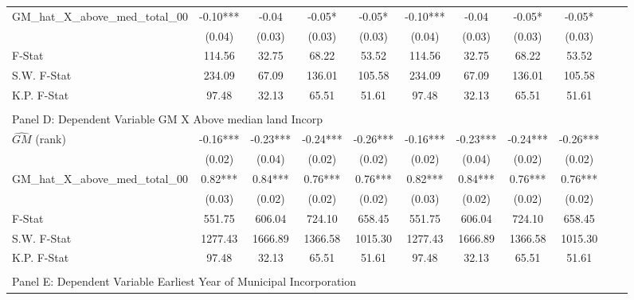 \begin{table}[htbp]
\begin{threeparttable}
\begin{tabular}{l*{10}{c}}
\addlinespace
GM\_hat\_X\_above\_med\_total\_00&      -0.10***&      -0.04   &      -0.05*  &      -0.05*  &      -0.10***&      -0.04   &      -0.05*  &      -0.05*  \\
                &     (0.04)   &     (0.03)   &     (0.03)   &     (0.03)   &     (0.04)   &     (0.03)   &     (0.03)   &     (0.03)   \\
\midrule
F-Stat          &     114.56   &      32.75   &      68.22   &      53.52   &     114.56   &      32.75   &      68.22   &      53.52   \\
S.W. F-Stat     &     234.09   &      67.09   &     136.01   &     105.58   &     234.09   &      67.09   &     136.01   &     105.58   \\
K.P. F-Stat     &      97.48   &      32.13   &      65.51   &      51.61   &      97.48   &      32.13   &      65.51   &      51.61   \\
\cmidrule[\heavyrulewidth](lr){1-9} \\ \cmidrule[\heavyrulewidth](lr){1-9}
\multicolumn{8}{l}{Panel D: Dependent Variable GM X Above median land Incorp}\\
\cmidrule(lr){1-9}
$\hat{GM}$ (rank)&      -0.16***&      -0.23***&      -0.24***&      -0.26***&      -0.16***&      -0.23***&      -0.24***&      -0.26***\\
                &     (0.02)   &     (0.04)   &     (0.02)   &     (0.02)   &     (0.02)   &     (0.04)   &     (0.02)   &     (0.02)   \\
\addlinespace
GM\_hat\_X\_above\_med\_total\_00&       0.82***&       0.84***&       0.76***&       0.76***&       0.82***&       0.84***&       0.76***&       0.76***\\
                &     (0.03)   &     (0.02)   &     (0.02)   &     (0.02)   &     (0.03)   &     (0.02)   &     (0.02)   &     (0.02)   \\
\midrule
F-Stat          &     551.75   &     606.04   &     724.10   &     658.45   &     551.75   &     606.04   &     724.10   &     658.45   \\
S.W. F-Stat     &    1277.43   &    1666.89   &    1366.58   &    1015.30   &    1277.43   &    1666.89   &    1366.58   &    1015.30   \\
K.P. F-Stat     &      97.48   &      32.13   &      65.51   &      51.61   &      97.48   &      32.13   &      65.51   &      51.61   \\
\cmidrule[\heavyrulewidth](lr){1-9} \\ \cmidrule[\heavyrulewidth](lr){1-9}
\multicolumn{8}{l}{Panel E: Dependent Variable Earliest Year of Municipal Incorporation}\\

\end{tabular}
\end{threeparttable}
\end{table}
